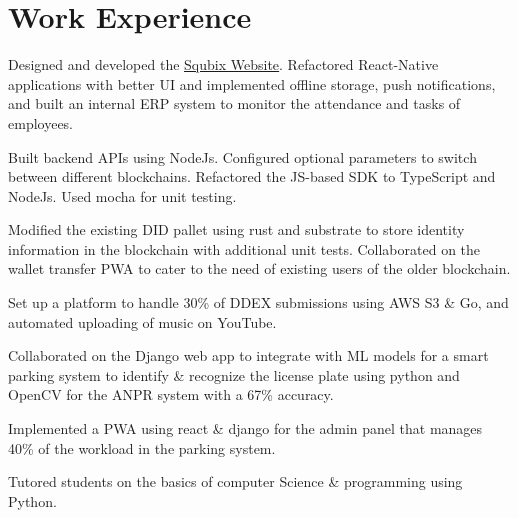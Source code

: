\documentclass[]{assets/deedy-resume-openfont}
\begin{document}
  \section{Work Experience}
  \hfill {}
      \begin{tightemize}
       \item Designed and developed the {\href{https://squbix.com/}{ \underline{Squbix Website}}}. Refactored React-Native applications with better UI and implemented offline storage, push notifications, and built an internal ERP system to monitor the attendance and tasks of employees.
       \item Built backend APIs using NodeJs. Configured optional parameters to switch between different blockchains. Refactored the JS-based SDK to TypeScript and NodeJs. Used mocha for unit testing.
       \item Modified the existing DID pallet using rust and substrate to store identity information in the blockchain with additional unit tests. Collaborated on the wallet transfer PWA to cater to the need of existing users of the older blockchain.
      \end{tightemize}
      \sectionsep
  \hfill {}
      \begin{tightemize}
    \item Set up a platform to handle 30\% of DDEX submissions using AWS S3 \& Go, and automated uploading of music on YouTube.
\end{tightemize}
      \sectionsep
  \hfill {}
      \begin{tightemize}
    \item Collaborated on the Django web app to integrate with ML models for a smart parking system to identify \& recognize the license plate using python and OpenCV for the ANPR system with a 67\% accuracy.
    \item Implemented a PWA using react \& django for the admin panel that manages 40\% of the workload in the parking system.
\end{tightemize}
      \sectionsep
      \hfill {}
      \begin{tightemize}
    \item Tutored students on the basics of computer Science \& programming using Python.
    \end{tightemize}
      \sectionsep
%
%
\end{document}
